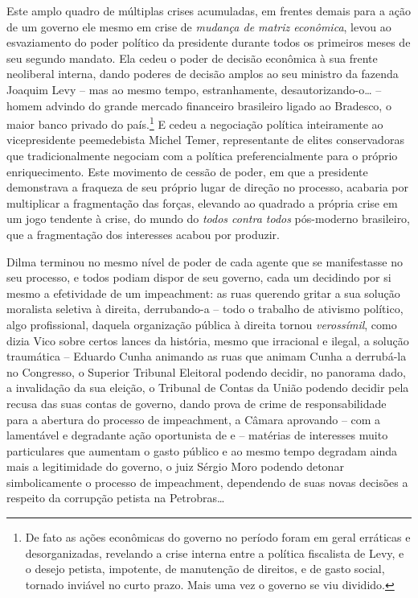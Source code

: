 Este amplo quadro de múltiplas crises acumuladas, em frentes demais para
a ação de um governo ele mesmo em crise de \emph{mudança de matriz
econômica}, levou ao esvaziamento do poder político da presidente
durante todos os primeiros meses de seu segundo mandato. Ela cedeu o
poder de decisão econômica à sua frente neoliberal interna, dando
poderes de decisão amplos ao seu ministro da fazenda Joaquim Levy -- mas
ao mesmo tempo, estranhamente, desautorizando-o… -- homem advindo do
grande mercado financeiro brasileiro ligado ao Bradesco, o maior banco
privado do país.\footnote{De fato as ações econômicas do governo no
  período foram em geral erráticas e desorganizadas, revelando a crise
  interna entre a política fiscalista de Levy, e o desejo petista,
  impotente, de manutenção de direitos, e de gasto social, tornado
  inviável no curto prazo. Mais uma vez o governo se viu dividido.} E
cedeu a negociação política inteiramente ao vicepresidente peemedebista
Michel Temer, representante de elites conservadoras que tradicionalmente
negociam com a política preferencialmente para o próprio enriquecimento.
Este movimento de cessão de poder, em que a presidente demonstrava a
fraqueza de seu próprio lugar de direção no processo, acabaria por
multiplicar a fragmentação das forças, elevando ao quadrado a própria
crise em um jogo tendente à crise, do mundo do \emph{todos contra todos}
pós-moderno brasileiro, que a fragmentação dos interesses acabou por
produzir.

Dilma terminou no mesmo nível de poder de cada agente que se
manifestasse no seu processo, e todos podiam dispor de seu governo, cada
um decidindo por si mesmo a efetividade de um impeachment: as ruas
querendo gritar a sua solução moralista seletiva à direita, derrubando-a
-- todo o trabalho de ativismo político, algo profissional, daquela
organização pública à direita tornou \emph{verossímil}, como dizia Vico
sobre certos lances da história, mesmo que irracional e ilegal, a
solução traumática -- Eduardo Cunha animando as ruas que animam Cunha a
derrubá-la no Congresso, o Superior Tribunal Eleitoral podendo decidir,
no panorama dado, a invalidação da sua eleição, o Tribunal de Contas da
União podendo decidir pela recusa das suas contas de governo, dando
prova de crime de responsabilidade para a abertura do processo de
impeachment, a Câmara aprovando -- com a lamentável e degradante ação
oportunista de  e  -- matérias de interesses muito particulares
que aumentam o gasto público e ao mesmo tempo degradam ainda mais a
legitimidade do governo, o juiz Sérgio Moro podendo detonar
simbolicamente o processo de impeachment, dependendo de suas novas
decisões a respeito da corrupção petista na Petrobras…

